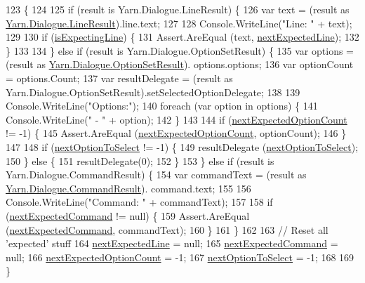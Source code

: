 \begin{DoxyCode}
123                                                                        \{
124 
125             \textcolor{keywordflow}{if} (result is Yarn.Dialogue.LineResult) \{
126                 var text = (result as \hyperlink{a00126}{Yarn.Dialogue.LineResult}).line.text;
127 
128                 Console.WriteLine(\textcolor{stringliteral}{"Line: "} + text);
129 
130                 \textcolor{keywordflow}{if} (\hyperlink{a00164_a47f35b8e8123ed9471883d02b8bc9f3e}{isExpectingLine}) \{
131                     Assert.AreEqual (text, \hyperlink{a00164_a3651ffb5425ab15bd1e42749347c1ee7}{nextExpectedLine});
132                 \}
133 
134             \} \textcolor{keywordflow}{else} \textcolor{keywordflow}{if} (result is Yarn.Dialogue.OptionSetResult) \{
135                 var options = (result as \hyperlink{a00139}{Yarn.Dialogue.OptionSetResult}).
      options.options;
136                 var optionCount = options.Count;
137                 var resultDelegate = (result as Yarn.Dialogue.OptionSetResult).setSelectedOptionDelegate;
138 
139                 Console.WriteLine(\textcolor{stringliteral}{"Options:"});
140                 \textcolor{keywordflow}{foreach} (var option \textcolor{keywordflow}{in} options) \{
141                     Console.WriteLine(\textcolor{stringliteral}{" - "} + option);
142                 \}
143 
144                 \textcolor{keywordflow}{if} (\hyperlink{a00164_aaabaf15249efe42f3d857129bdbc2864}{nextExpectedOptionCount} != -1) \{
145                     Assert.AreEqual (\hyperlink{a00164_aaabaf15249efe42f3d857129bdbc2864}{nextExpectedOptionCount}, optionCount);
146                 \}
147 
148                 \textcolor{keywordflow}{if} (\hyperlink{a00164_a343055fa693e9d5dfc1bdbfcd0f02676}{nextOptionToSelect} != -1) \{
149                     resultDelegate (\hyperlink{a00164_a343055fa693e9d5dfc1bdbfcd0f02676}{nextOptionToSelect});
150                 \} \textcolor{keywordflow}{else} \{
151                     resultDelegate(0);
152                 \}
153             \} \textcolor{keywordflow}{else} \textcolor{keywordflow}{if} (result is Yarn.Dialogue.CommandResult) \{
154                 var commandText = (result as \hyperlink{a00046}{Yarn.Dialogue.CommandResult}).
      command.text;
155 
156                 Console.WriteLine(\textcolor{stringliteral}{"Command: "} + commandText);
157 
158                 \textcolor{keywordflow}{if} (\hyperlink{a00164_a26fae5694fc06c3cdb12d3108dbc34de}{nextExpectedCommand} != null) \{
159                     Assert.AreEqual (\hyperlink{a00164_a26fae5694fc06c3cdb12d3108dbc34de}{nextExpectedCommand}, commandText);
160                 \}
161             \}
162 
163             \textcolor{comment}{// Reset all 'expected' stuff}
164             \hyperlink{a00164_a3651ffb5425ab15bd1e42749347c1ee7}{nextExpectedLine} = null;
165             \hyperlink{a00164_a26fae5694fc06c3cdb12d3108dbc34de}{nextExpectedCommand} = null;
166             \hyperlink{a00164_aaabaf15249efe42f3d857129bdbc2864}{nextExpectedOptionCount} = -1;
167             \hyperlink{a00164_a343055fa693e9d5dfc1bdbfcd0f02676}{nextOptionToSelect} = -1;
168 
169         \}
\end{DoxyCode}
